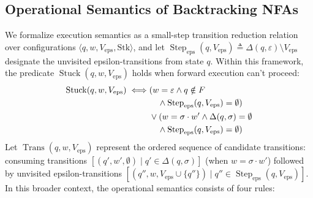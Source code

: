 \documentclass{ieeeaccess}
\begin{document}
\subsection{Operational Semantics of Backtracking NFAs}
We formalize execution semantics as a small-step transition reduction relation over configurations $\langle q, w, V_{\mathrm{eps}}, \mathrm{Stk} \rangle$, and let $\operatorname{Step}_{\mathrm{eps}}(q, V_{\mathrm{eps}}) \triangleq \Delta(q, \varepsilon) \setminus V_{\mathrm{eps}}$ designate the unvisited epsilon-transitions from state $q$. Within this framework, the predicate $\operatorname{Stuck}(q, w, V_{\mathrm{eps}})$ holds when forward execution can't proceed:
\begin{align}\label{eq:stuck_pred}
\operatorname{Stuck}(q, w, V_{\mathrm{eps}}) \iff & (w = \varepsilon \land q \notin F \notag \\
& \quad \land \operatorname{Step}_{\mathrm{eps}}(q, V_{\mathrm{eps}}) = \emptyset) \notag \\
& \lor (w = \sigma \cdot w' \land \Delta(q, \sigma) = \emptyset \notag \\
& \quad \land \operatorname{Step}_{\mathrm{eps}}(q, V_{\mathrm{eps}}) = \emptyset)
\end{align}
Let $\operatorname{Trans}(q, w, V_{\mathrm{eps}})$ represent the ordered sequence of candidate transitions: consuming transitions $[(q', w', \emptyset) \mid q' \in \Delta(q, \sigma)]$ (when $w = \sigma \cdot w'$) followed by unvisited epsilon-transitions $[(q'', w, V_{\mathrm{eps}} \cup \{q''\}) \mid q'' \in \operatorname{Step}_{\mathrm{eps}}(q, V_{\mathrm{eps}})]$. In this broader context, the operational semantics consists of four rules:
\end{document}
